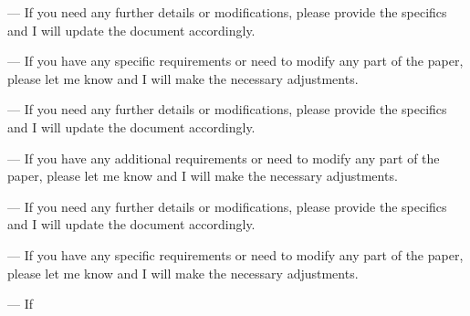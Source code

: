 --- 
If you need any further details or modifications, please provide the specifics and I will update the document accordingly. 

--- 
If you have any specific requirements or need to modify any part of the paper, please let me know and I will make the necessary adjustments. 

--- 
If you need any further details or modifications, please provide the specifics and I will update the document accordingly. 

--- 
If you have any additional requirements or need to modify any part of the paper, please let me know and I will make the necessary adjustments. 

--- 
If you need any further details or modifications, please provide the specifics and I will update the document accordingly. 

--- 
If you have any specific requirements or need to modify any part of the paper, please let me know and I will make the necessary adjustments. 

--- 
If